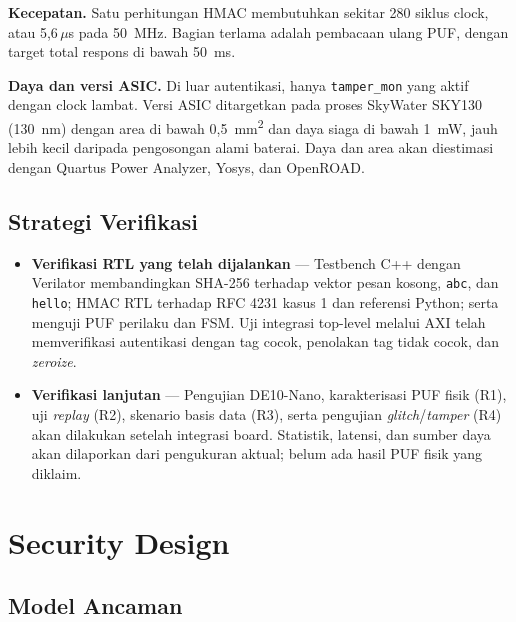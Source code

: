 \documentclass[11pt,a4paper]{article}
\begin{document}
\textbf{Kecepatan.} Satu perhitungan HMAC membutuhkan sekitar 280 siklus clock, atau 5,6\,$\mu$s pada 50~MHz. Bagian terlama adalah pembacaan ulang PUF, dengan target total respons di bawah 50~ms.

\textbf{Daya dan versi ASIC.} Di luar autentikasi, hanya \texttt{tamper\_mon} yang aktif dengan clock lambat. Versi ASIC ditargetkan pada proses SkyWater SKY130 (130~nm) dengan area di bawah 0,5~mm\textsuperscript{2} dan daya siaga di bawah 1~mW, jauh lebih kecil daripada pengosongan alami baterai. Daya dan area akan diestimasi dengan Quartus Power Analyzer, Yosys, dan OpenROAD.

\subsection{Strategi Verifikasi}

\begin{itemize}
  \item \textbf{Verifikasi RTL yang telah dijalankan} --- Testbench C++ dengan Verilator membandingkan SHA-256 terhadap vektor pesan kosong, \texttt{abc}, dan \texttt{hello}; HMAC RTL terhadap RFC 4231 kasus 1 dan referensi Python; serta menguji PUF perilaku dan FSM. Uji integrasi top-level melalui AXI telah memverifikasi autentikasi dengan tag cocok, penolakan tag tidak cocok, dan \emph{zeroize}.
  \item \textbf{Verifikasi lanjutan} --- Pengujian DE10-Nano, karakterisasi PUF fisik (R1), uji \emph{replay} (R2), skenario basis data (R3), serta pengujian \emph{glitch}/\emph{tamper} (R4) akan dilakukan setelah integrasi board. Statistik, latensi, dan sumber daya akan dilaporkan dari pengukuran aktual; belum ada hasil PUF fisik yang diklaim.
\end{itemize}

\section{Security Design}

\subsection{Model Ancaman}
\end{document}
